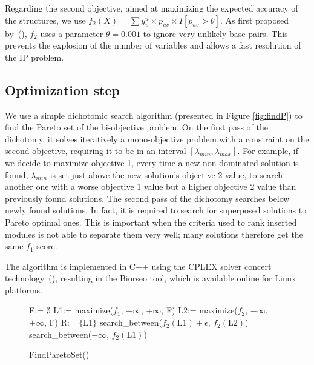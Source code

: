 \documentclass{bioinfo}
\begin{document}
\begin{methods}
Regarding the second objective, aimed at maximizing the expected accuracy of the structures, we use $f_2(X) = \sum y^u_v \times p_{uv} \times I[p_{uv}>\theta]$. As first proposed by~(\citealp{sato_ipknot:_2011}), $f_2$ uses a parameter $\theta = 0.001$ to ignore very unlikely base-pairs. This prevents the explosion of the number of variables and allows a fast resolution of the IP problem.


\subsection{Optimization step}
We use a simple dichotomic search algorithm (presented in Figure \ref{fig:findP}) to find the Pareto set of the bi-objective problem. On the first pass of the dichotomy, it solves iteratively a mono-objective problem with a constraint on the second objective, requiring it to be in an interval $[\lambda_{min}, \lambda_{max}]$. For example, if we decide to maximize objective 1, every-time a new non-dominated solution is found, $\lambda_{min}$ is set just above the new solution's objective 2 value, to search another one with a worse objective 1 value but a higher objective 2 value than previously found solutions. The second pass of the dichotomy searches below newly found solutions. In fact, it is required to search for superposed solutions to Pareto optimal ones. This is important when the criteria used to rank inserted modules is not able to separate them very well; many solutions therefore get the same $f_1$ score.

The algorithm is implemented  in C++ using the CPLEX solver concert technology~(\citealp{cplex}), resulting in the Biorseo tool, which is available online for Linux platforms.
\begin{figure}[!tbp]
\begin{algorithm}[H]
F:= $\emptyset$\;
L1:= maximize($f_1$, $-\infty$, $+\infty$, F)\;
L2:= maximize($f_2$, $-\infty$, $+\infty$, F)\;
R:= $\{$L1$\}$\;
search\_between($f_2(\text{L1}) + \epsilon$, $f_2(\text{L2})$)\;
search\_between($-\infty$, $f_2(\text{L1})$)\;
\;
\caption{FindParetoSet()}
\end{algorithm}


\end{figure}
\end{methods}
\end{document}
